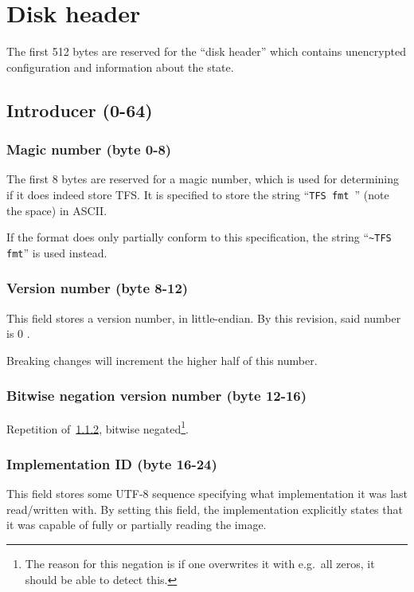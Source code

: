 \documentclass[11pt,a4paper]{report}
\newcommand{\clustersize}{512 }
\newcommand{\versionnumber}{0 }
\begin{document}
    \chapter{Disk header}
    The first \clustersize bytes are reserved for the ``disk header'' which
    contains unencrypted configuration and information about the state.

    \section{Introducer (0-64)}
        \subsection{Magic number (byte 0-8)}
        The first 8 bytes are reserved for a magic number, which is used for
        determining if it does indeed store TFS\@. It is specified to store the
        string ``\texttt{TFS fmt }'' (note the space) in ASCII.

        If the format does only partially conform to this specification, the
        string ``\texttt{\textasciitilde TFS fmt}'' is used instead.

        \subsection{Version number (byte 8-12)}
        \label{header:versionnumber}
        This field stores a version number, in little-endian. By this revision,
        said number is \versionnumber.

        Breaking changes will increment the higher half of this number.

        \subsection{Bitwise negation version number (byte 12-16)}
        Repetition of~\ref{header:versionnumber}, bitwise
        negated\footnote{The reason for this negation is if one overwrites it
        with e.g.\ all zeros, it should be able to detect this.}.

        \subsection{Implementation ID (byte 16-24)}
        \label{header:implementationid}
        This field stores some UTF-8 sequence specifying what implementation it
        was last read/written with. By setting this field, the implementation
        explicitly states that it was capable of fully or partially reading the
        image.
\end{document}
